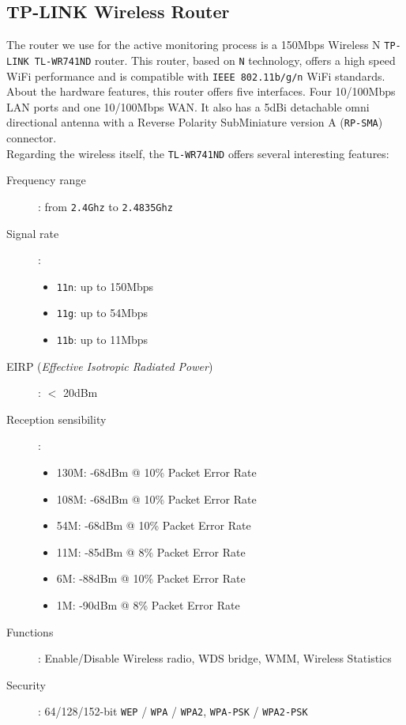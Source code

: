 \subsection{TP-LINK Wireless Router}
The router we use for the active monitoring process is a 150Mbps Wireless N \texttt{TP-LINK TL-WR741ND} router. This router, based on \texttt{N} technology, offers a high speed WiFi performance and is compatible with \texttt{IEEE 802.11b/g/n} WiFi standards. \\
About the hardware features, this router offers five interfaces. Four 10/100Mbps LAN ports and one 10/100Mbps WAN. It also has a 5dBi detachable omni directional antenna with a Reverse Polarity SubMiniature version A (\texttt{RP-SMA}) connector.\\
Regarding the wireless itself, the \texttt{TL-WR741ND} offers several interesting features\cite{tplink}:

\begin{description}
	\item [Frequency range]: from \texttt{2.4Ghz} to \texttt{2.4835Ghz}
	\item [Signal rate]:
		\begin{itemize}
			\item \texttt{11n}: up to 150Mbps
			\item \texttt{11g}: up to 54Mbps
			\item \texttt{11b}: up to 11Mbps
		\end{itemize}
	\item [EIRP (\textit{Effective Isotropic Radiated Power})]: $<$ 20dBm 
	\item [Reception sensibility]:
		\begin{itemize}
			\item 130M: -68dBm @ 10\% Packet Error Rate
			\item 108M: -68dBm @ 10\% Packet Error Rate
			\item 54M: -68dBm @ 10\% Packet Error Rate
			\item 11M: -85dBm @ 8\% Packet Error Rate
			\item 6M: -88dBm @ 10\% Packet Error Rate
			\item 1M: -90dBm @ 8\% Packet Error Rate
		\end{itemize}
	\item [Functions]: Enable/Disable Wireless radio, WDS bridge, WMM, Wireless Statistics
	\item [Security]: 64/128/152-bit \texttt{WEP} / \texttt{WPA} / \texttt{WPA2}, \texttt{WPA-PSK} / \texttt{WPA2-PSK}
\end{description}

